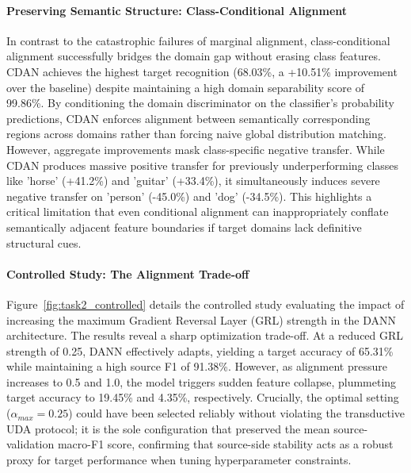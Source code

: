 \documentclass{article}
\begin{document}
\paragraph{Preserving Semantic Structure: Class-Conditional Alignment}
In contrast to the catastrophic failures of marginal alignment, class-conditional alignment successfully bridges the domain gap without erasing class features. CDAN achieves the highest target recognition (68.03\%, a +10.51\% improvement over the baseline) despite maintaining a high domain separability score of 99.86\%. By conditioning the domain discriminator on the classifier's probability predictions, CDAN enforces alignment between semantically corresponding regions across domains rather than forcing naive global distribution matching. However, aggregate improvements mask class-specific negative transfer. While CDAN produces massive positive transfer for previously underperforming classes like 'horse' (+41.2\%) and 'guitar' (+33.4\%), it simultaneously induces severe negative transfer on 'person' (-45.0\%) and 'dog' (-34.5\%). This highlights a critical limitation that even conditional alignment can inappropriately conflate semantically adjacent feature boundaries if target domains lack definitive structural cues.

\paragraph{Controlled Study: The Alignment Trade-off}
Figure~\ref{fig:task2_controlled} details the controlled study evaluating the impact of increasing the maximum Gradient Reversal Layer (GRL) strength in the DANN architecture. The results reveal a sharp optimization trade-off. At a reduced GRL strength of 0.25, DANN effectively adapts, yielding a target accuracy of 65.31\% while maintaining a high source F1 of 91.38\%. However, as alignment pressure increases to 0.5 and 1.0, the model triggers sudden feature collapse, plummeting target accuracy to 19.45\% and 4.35\%, respectively. Crucially, the optimal setting ($\alpha_{max}=0.25$) could have been selected reliably without violating the transductive UDA protocol; it is the sole configuration that preserved the mean source-validation macro-F1 score, confirming that source-side stability acts as a robust proxy for target performance when tuning hyperparameter constraints.
\end{document}
